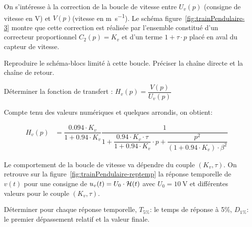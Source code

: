 \begin{Exo}[name={Devoir},title={Système de pendulation},origin={Adapté de Centrale MP 2000},label={exo:CentralePendulation}]

On s’intéresse à la correction de la boucle de vitesse  entre $U_v(p)$ (consigne de  vitesse  en \si{\volt})  et $V(p)$(vitesse en \si{\metre\per\second}). Le schéma figure~\ref{fig:trainPendulaire-3} 
montre que cette correction est réalisée par l’ensemble constitué d’un correcteur
proportionnel $C_2(p)=K_v$  et d’un terme $1+\tau\cdot p$   placé  en aval du capteur de vitesse.


\qst Reproduire le schéma-blocs limité à cette boucle. Préciser la chaîne directe et la chaîne de retour.



\Acompleter[12]



\qst Déterminer la fonction de transfert : $H_v(p)=\dfrac{V(p)}{U_v(p)}$



\Acompleter[12]

Compte tenu des valeurs numériques et quelques arrondis, on obtient:

\begin{align*}
H_v(p)&=\dfrac{\num{0.094}\cdot K_v}{1+\num{0.94}\cdot K_v}\dfrac{1}{1+\dfrac{\num{0.94}\cdot K_v\cdot\tau}{1+\num{0.94}\cdot K_v}\cdot p+\dfrac{p^2}{(1+\num{0.94}\cdot K_v)\cdot\beta^2}}
\end{align*}


Le comportement de la boucle de vitesse va dépendre du couple $(K_v,\tau)$.  On retrouve sur la figure~\ref{fig:trainPendulaire-reptemp}  la réponse temporelle de $v(t)$  pour une consigne de $u_v(t)=U_0\cdot \mathcal {H}(t)$ avec $U_0=\SI{10}{\volt}$  et différentes valeurs pour le couple $(K_v,\tau)$.

\qst Déterminer pour chaque réponse temporelle, $T_{5\%}$: le temps de réponse à 5\%, $D_{1\%}$: le premier dépassement relatif  et la valeur finale.

\Acompleter[6]



\clearpage



\begin{figure}[H]
\centering

\end{figure}
\end{Exo}
